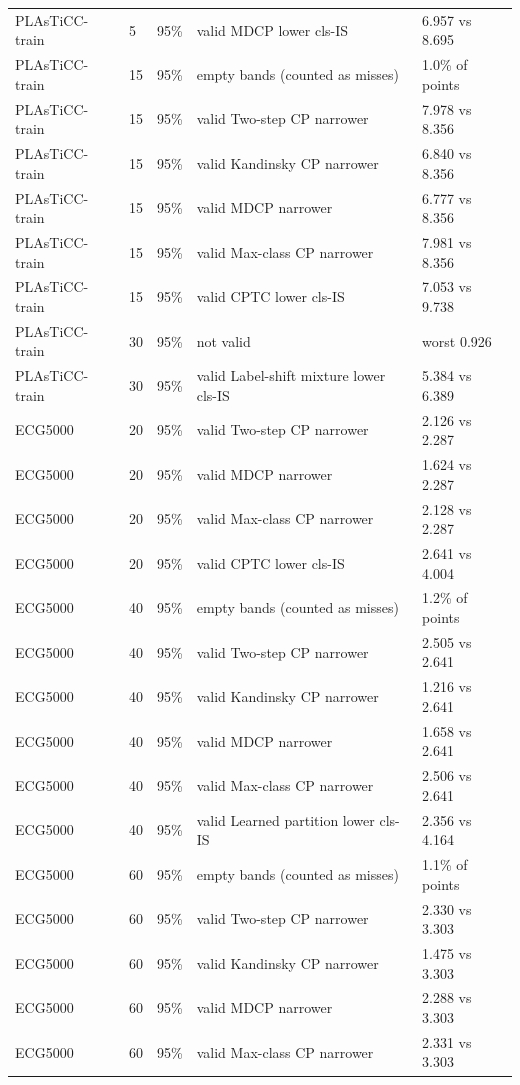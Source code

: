 \begin{longtable}{lllll}
PLAsTiCC-train & 5 & 95\% & valid MDCP lower cls-IS & 6.957 vs 8.695 \\
PLAsTiCC-train & 15 & 95\% & \gamut{} empty bands (counted as misses) & 1.0\% of points \\
PLAsTiCC-train & 15 & 95\% & valid Two-step CP narrower & 7.978 vs 8.356 \\
PLAsTiCC-train & 15 & 95\% & valid Kandinsky CP narrower & 6.840 vs 8.356 \\
PLAsTiCC-train & 15 & 95\% & valid MDCP narrower & 6.777 vs 8.356 \\
PLAsTiCC-train & 15 & 95\% & valid Max-class CP narrower & 7.981 vs 8.356 \\
PLAsTiCC-train & 15 & 95\% & valid CPTC lower cls-IS & 7.053 vs 9.738 \\
PLAsTiCC-train & 30 & 95\% & \gamut{} not valid & worst 0.926 \\
PLAsTiCC-train & 30 & 95\% & valid Label-shift mixture lower cls-IS & 5.384 vs 6.389 \\
ECG5000 & 20 & 95\% & valid Two-step CP narrower & 2.126 vs 2.287 \\
ECG5000 & 20 & 95\% & valid MDCP narrower & 1.624 vs 2.287 \\
ECG5000 & 20 & 95\% & valid Max-class CP narrower & 2.128 vs 2.287 \\
ECG5000 & 20 & 95\% & valid CPTC lower cls-IS & 2.641 vs 4.004 \\
ECG5000 & 40 & 95\% & \gamut{} empty bands (counted as misses) & 1.2\% of points \\
ECG5000 & 40 & 95\% & valid Two-step CP narrower & 2.505 vs 2.641 \\
ECG5000 & 40 & 95\% & valid Kandinsky CP narrower & 1.216 vs 2.641 \\
ECG5000 & 40 & 95\% & valid MDCP narrower & 1.658 vs 2.641 \\
ECG5000 & 40 & 95\% & valid Max-class CP narrower & 2.506 vs 2.641 \\
ECG5000 & 40 & 95\% & valid Learned partition lower cls-IS & 2.356 vs 4.164 \\
ECG5000 & 60 & 95\% & \gamut{} empty bands (counted as misses) & 1.1\% of points \\
ECG5000 & 60 & 95\% & valid Two-step CP narrower & 2.330 vs 3.303 \\
ECG5000 & 60 & 95\% & valid Kandinsky CP narrower & 1.475 vs 3.303 \\
ECG5000 & 60 & 95\% & valid MDCP narrower & 2.288 vs 3.303 \\
ECG5000 & 60 & 95\% & valid Max-class CP narrower & 2.331 vs 3.303 \\

\end{longtable}
